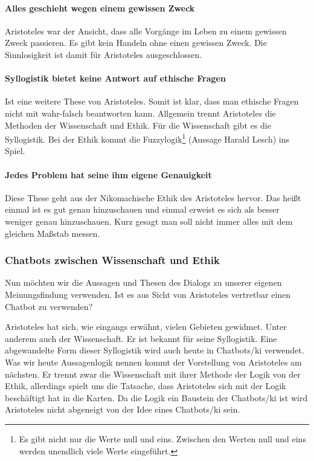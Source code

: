 \paragraph{Alles geschieht wegen einem gewissen Zweck} 
Aristoteles war der Ansicht, dass alle Vorgänge im Leben zu einem gewissen Zweck passieren. Es gibt kein Handeln ohne einen gewissen Zweck. Die Sinnlosigkeit ist damit für Aristoteles ausgeschlossen.

\paragraph{Syllogistik bietet keine Antwort auf ethische Fragen} 
Ist eine weitere These von Aristoteles. Somit ist klar, dass man ethische Fragen nicht mit wahr-falsch beantworten kann. Allgemein trennt Aristoteles die Methoden der Wissenschaft und Ethik. Für die Wissenschaft gibt es die Syllogistik. Bei der Ethik kommt die Fuzzylogik\footnote{Es gibt nicht nur die Werte null und eins. Zwischen  den Werten null und eins werden unendlich viele Werte eingeführt.} (Aussage Harald Lesch) ins Spiel.

\paragraph{Jedes Problem hat seine ihm eigene Genauigkeit} 
Diese These geht aus der Nikomachische Ethik des Aristoteles hervor. Das heißt einmal ist es gut genau hinzuschauen und einmal erweist es sich als besser weniger genau hinzuschauen. Kurz gesagt man soll nicht immer alles mit dem gleichen Maßstab messen.

\subsubsection{Chatbots zwischen Wissenschaft und Ethik}

Nun möchten wir die Aussagen und Thesen des Dialogs zu unserer eigenen Meinungsfindung verwenden. Ist es aus Sicht von Aristoteles vertretbar einen Chatbot zu verwenden? 

Aristoteles hat sich, wie eingangs erwähnt, vielen Gebieten gewidmet. Unter anderem auch der Wissenschaft. Er ist bekannt für seine Syllogistik. Eine abgewandelte Form dieser Syllogistik wird auch heute in Chatbots/\ac{ki} verwendet. Was wir heute Aussagenlogik nennen kommt der Vorstellung von Aristoteles am nächsten. Er trennt zwar die Wissenschaft mit ihrer Methode der Logik von der Ethik, allerdings spielt uns die Tatsache, dass Aristoteles sich mit der Logik beschäftigt hat in die Karten. Da die Logik ein Baustein der Chatbots/\ac{ki} ist wird Aristoteles nicht abgeneigt von der Idee eines Chatbots/\ac{ki} sein. 

